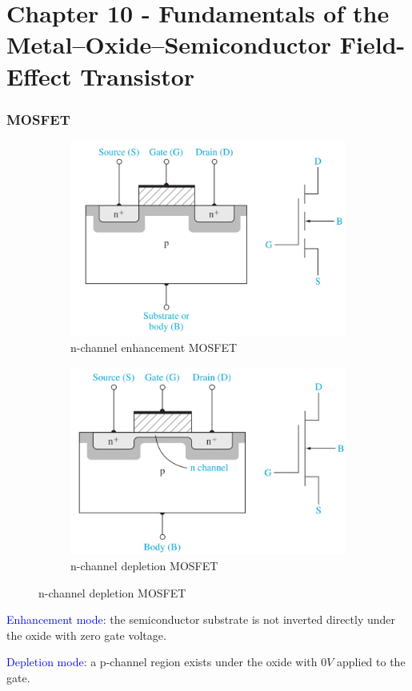 \documentclass{beamer}
\begin{document}
\section{Chapter 10 - Fundamentals of the Metal–Oxide–Semiconductor Field-Effect Transistor}
    \begin{frame} \frametitle{MOSFET}
        \begin{figure}[H]
            \centering
            \begin{subfigure}[t]{0.45\linewidth}
                \centering
                \includegraphics[width=0.9\linewidth]{NMOS-enhancement.jpg}
                \caption{n-channel enhancement MOSFET}
                \label{subfig:NMOS-enhancement.jpg}
            \end{subfigure}
            \begin{subfigure}[t]{0.45\linewidth}
                \centering
                \includegraphics[width=0.9\linewidth]{NMOS-depletion.jpg}
                \caption{n-channel depletion MOSFET}
                \label{subfig:NMOS-depletion.jpg}
            \end{subfigure}
        \end{figure}
        
        \par \textcolor{blue}{Enhancement mode}: the semiconductor substrate is not inverted directly under the oxide with zero gate voltage.
        \par \textcolor{blue}{Depletion mode}: a p-channel region exists under the oxide with $0V$ applied to the gate.
    \end{frame}
\end{document}
